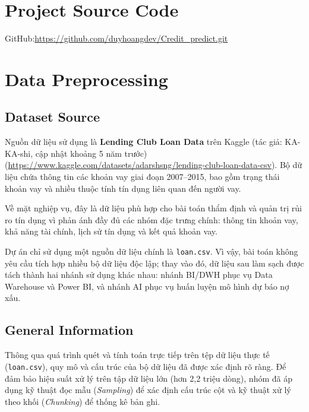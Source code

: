 \section{Project Source Code}

GitHub:\url{https://github.com/duyhoangdev/Credit_predict.git}
\section{Data Preprocessing}

\subsection{Dataset Source}
Nguồn dữ liệu sử dụng là \textbf{Lending Club Loan Data} trên Kaggle (tác giả: KA-KA-shi, cập nhật khoảng 5 năm trước) (\url{https://www.kaggle.com/datasets/adarshsng/lending-club-loan-data-csv}). Bộ dữ liệu chứa thông tin các khoản vay giai đoạn 2007--2015, bao gồm trạng thái khoản vay và nhiều thuộc tính tín dụng liên quan đến người vay.

Về mặt nghiệp vụ, đây là dữ liệu phù hợp cho bài toán thẩm định và quản trị rủi ro tín dụng vì phản ánh đầy đủ các nhóm đặc trưng chính: thông tin khoản vay, khả năng tài chính, lịch sử tín dụng và kết quả khoản vay.

Dự án chỉ sử dụng một nguồn dữ liệu chính là \texttt{loan.csv}. Vì vậy, bài toán không yêu cầu tích hợp nhiều bộ dữ liệu độc lập; thay vào đó, dữ liệu sau làm sạch được tách thành hai nhánh sử dụng khác nhau: nhánh BI/DWH phục vụ Data Warehouse và Power BI, và nhánh AI phục vụ huấn luyện mô hình dự báo nợ xấu.

\subsection{General Information}
Thông qua quá trình quét và tính toán trực tiếp trên tệp dữ liệu thực tế (\texttt{loan.csv}), quy mô và cấu trúc của bộ dữ liệu đã được xác định rõ ràng. Để đảm bảo hiệu suất xử lý trên tập dữ liệu lớn (hơn 2,2 triệu dòng), nhóm đã áp dụng kỹ thuật đọc mẫu (\textit{Sampling}) để xác định cấu trúc cột và kỹ thuật xử lý theo khối (\textit{Chunking}) để thống kê bản ghi.

